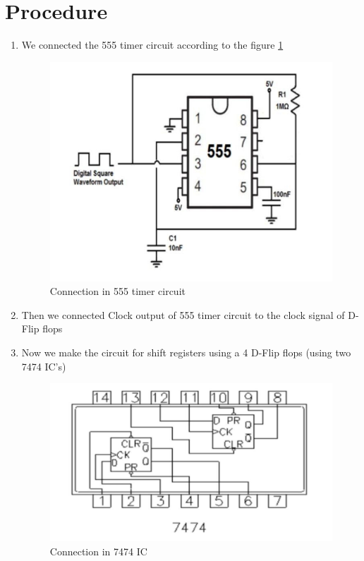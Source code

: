 \documentclass[journal,12pt,twocolumn]{IEEEtran}
\begin{document}
\section*{Procedure}
\begin{enumerate}
	\item We connected the 555 timer circuit according to the figure \ref{555_t_c}
	\begin{figure}[h]
		\includegraphics[width=\linewidth]{images/555_timer_circuit.jpg}
		\caption{Connection in 555 timer circuit}
		\label{555_t_c}
	\end{figure}
	
	\item Then we connected Clock output of 555 timer circuit to the clock signal of D-Flip flops
	
	\item Now we make the circuit for shift registers using a 4 D-Flip flops (using two 7474 IC's)
	\begin{figure}[h]
		\includegraphics[width=\linewidth]{images/7474.jpg}
		\caption{Connection in 7474 IC}
		\label{7474_IC}
	\end{figure}


\end{enumerate}
\end{document}
